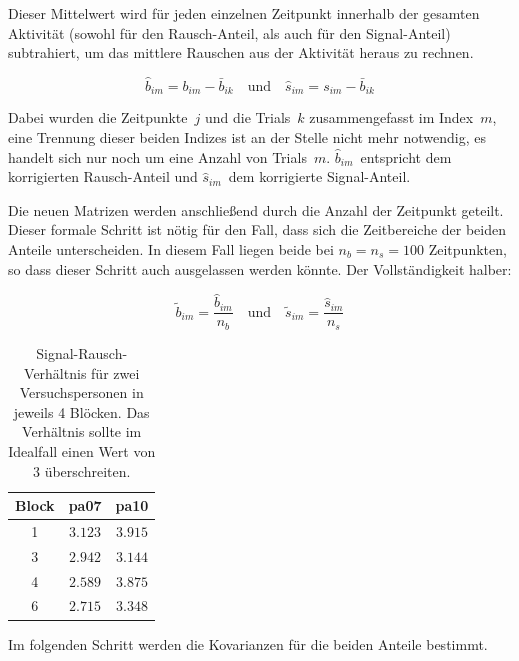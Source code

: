 \documentclass[doc,a4paper,12pt]{apa6}
\renewcommand{\arraystretch}{1.2}
\begin{document}
Dieser Mittelwert wird für jeden einzelnen Zeitpunkt innerhalb der gesamten Aktivität (sowohl für den Rausch-Anteil, als auch für den Signal-Anteil) subtrahiert, um das mittlere Rauschen aus der Aktivität heraus zu rechnen.

\begin{equation}
\hat{b}_{im} = b_{im} - \bar{b}_{ik} \quad \text{und} \quad \hat{s}_{im} = s_{im} - \bar{b}_{ik}
\end{equation}

Dabei wurden die Zeitpunkte~$j$ und die Trials~$k$ zusammengefasst im Index~$m$, eine Trennung dieser beiden Indizes ist an der Stelle nicht mehr notwendig, es handelt sich nur noch um eine Anzahl von Trials~$m$. $\hat{b}_{im}$~entspricht dem korrigierten Rausch-Anteil und $\hat{s}_{im}$~dem korrigierte Signal-Anteil.

Die neuen Matrizen werden anschließend durch die Anzahl der Zeitpunkt geteilt. Dieser formale Schritt ist nötig für den Fall, dass sich die Zeitbereiche der beiden Anteile unterscheiden. In diesem Fall liegen beide bei $n_b = n_s = 100$ Zeitpunkten, so dass dieser Schritt auch ausgelassen werden könnte. Der Vollständigkeit halber:

\begin{equation}
\tilde{b}_{im} = \frac{\hat{b}_{im}}{n_b} \quad \text{und} \quad \tilde{s}_{im} = \frac{\hat{s}_{im}}{n_s}
\end{equation}

\begin{table}[t]
  \caption{}
  \label{tab:snr}
  \vspace*{3mm}
  \centering
  \setlength{\tabcolsep}{1cm}
  \renewcommand{\arraystretch}{1.5}
  \begin{tabular}{ccc}
  \hline
  Block & pa07 & pa10 \\
  \hline
  1 & $3.123$ & $3.915$\\
  3 & $2.942$ & $3.144$\\
  4 & $2.589$ & $3.875$\\
  6 & $2.715$ & $3.348$\\
  \hline
  \end{tabular}
  \vspace*{3mm}
  \caption*{Signal-Rausch-Verhältnis für zwei Versuchspersonen in jeweils 4 Blöcken. Das Verhältnis sollte im Idealfall einen Wert von $3$ überschreiten.}
\end{table}

Im folgenden Schritt werden die Kovarianzen für die beiden Anteile bestimmt.
\end{document}
